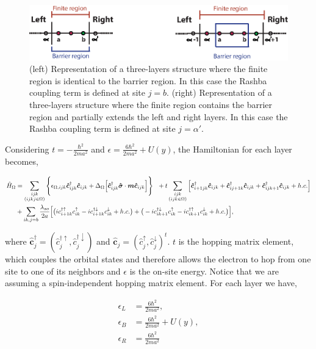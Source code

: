 \documentclass[10pt,prb,showpacs,amssymb,floatfix]{revtex4-1}
\newcommand{\dg}{\dagger}
\newcommand{\dna}{\downarrow}
\newcommand{\nn}{\nonumber}
\newcommand{\upa}{\uparrow}
\newcommand{\alp}{\alpha}
\newcommand{\Dlt}{\Delta}
\newcommand{\eps}{\epsilon}
\newcommand{\Og}{\Omega}
\newcommand{\sg}{\sigma}
\newcommand{\h}{\hat}
\begin{document}
\begin{figure}[ht]
\centering
\includegraphics{fig2.eps}
\caption{(left) Representation of a three-layers structure where the finite region is identical to the barrier region. In this case the Rashba coupling term is defined at site $j = b$. (right) Representation of a three-layers structure where the finite region contains the barrier region and partially extends the left and right layers. In this case the Rashba coupling term is defined at site $j = \alp'$.}
\label{junction}
\end{figure}

Considering $t=-\frac{\hbar^2}{2ma^2}$ and $\eps =\frac{6\hbar^2}{2ma^2} + U(y)$, the Hamiltonian for each layer becomes,

\begin{align}
\h H_\Og &= \sum_{\substack{ijk \\ (ijkj \in \Og)}} \Bigg{\{} \eps_{ \Og,ijk} \bm{\h c}^{\dg}_{ijk} \bm{\h c}_{ijk} + \Dlt_\Og \Big{[}   \bm{\h c}^{\dg}_{ijk} \bm{\h \sg}\cdot\bm m\bm{\h c}_{ijk} \Big{]} \Bigg{\}}~~+ t\sum_{\substack{ijk \\ (ijk \in \Og)}}  \Big{[} \bm{\h c}^{\dg}_{i+1jk} \bm{\h c}_{ijk}+ \bm{\h c}^{\dg}_{ij+1k} \bm{\h c}_{ijk}+ \bm{\h c}^{\dg}_{ijk+1} \bm{\h c}_{ijk}  + h.c. \Big{]} \nn\\
&+\sum_{ik, j=b} \frac{\lambda_{so}}{2a} \Big{[} \big{(}i c_{i+1k}^{\dagger \uparrow} c_{ik}^\uparrow  - i c_{i+1k}^{\dagger \downarrow} c_{ik}^\downarrow + h.c. \big{)} +  \big{(} -i c_{ik+1}^{\dagger \downarrow}  c_{ik}^\uparrow  - i c_{ik+1}^{\dagger \uparrow}  c_{ik}^\downarrow + h.c. \big{)}  \Big{]},
\label{eq:wogo}
\end{align}


 where $\bm{\h c}^{\dg}_{j} =(\h c^{\dg \upa}_j,\h c^{\dg \dna}_j)$ and  $\bm{\h c}_{j} =(\h c^{\upa}_j,\h c^{\dna}_j)^t$. $t$ is the hopping matrix element, which couples the orbital states and therefore allows the electron to hop from one site to one of its neighbors and $\eps$ is the on-site energy. Notice that we are assuming a spin-independent hopping matrix element. For each layer we have,
 
 \begin{align}
\eps_L &= \frac{6\hbar^2}{2ma^2},  \\
\eps_B &= \frac{6\hbar^2}{2ma^2} + U(y), \\
\eps_R &= \frac{6\hbar^2}{2ma^2} 
\label{eq:wogoleft}
\end{align}
 
\end{document}
